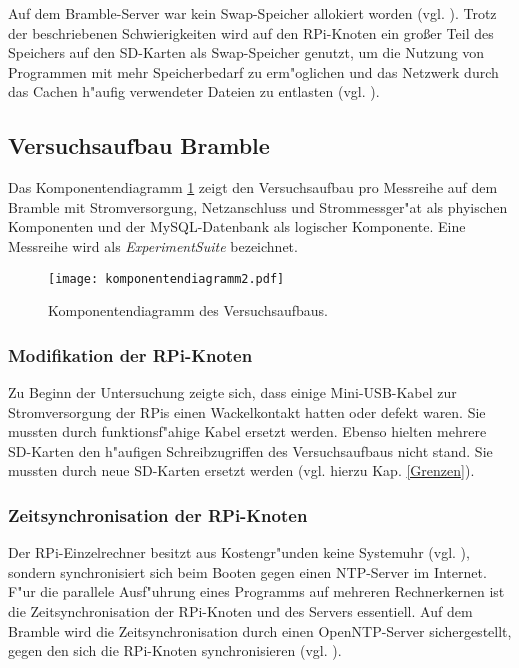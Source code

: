 Auf dem Bramble-Server war kein Swap-Speicher allokiert worden (vgl. \cite{kli13}). Trotz der beschriebenen Schwierigkeiten wird auf den RPi-Knoten ein gro\ss er Teil des Speichers auf den SD-Karten als Swap-Speicher genutzt, um die Nutzung von Programmen mit mehr Speicherbedarf zu erm"oglichen und das Netzwerk durch das Cachen h"aufig verwendeter Dateien zu entlasten (vgl. \cite{kli13}).  

\subsection{Versuchsaufbau Bramble}\label{Bramble-Versuchsaufbau}

Das Komponentendiagramm \ref{fig:Komponentendiagramm} zeigt den Versuchsaufbau pro Messreihe auf dem Bramble mit Stromversorgung, Netzanschluss und Strommessger"at als phyischen Komponenten und der MySQL-Datenbank als logischer Komponente. Eine Messreihe wird als \textit{ExperimentSuite} bezeichnet. 
\begin{figure}[htb]
  \centering
  \centerline{\texttt{[image: komponentendiagramm2.pdf]}} 
  \caption{Komponentendiagramm des Versuchsaufbaus.}
  \label{fig:Komponentendiagramm}		
\end{figure}
\subsubsection{Modifikation der RPi-Knoten}

Zu Beginn der Untersuchung zeigte sich, dass einige Mini-USB-Kabel zur Stromversorgung der RPis einen Wackelkontakt hatten oder defekt waren. Sie mussten durch funktionsf"ahige Kabel ersetzt werden. Ebenso hielten mehrere SD-Karten den h"aufigen Schreibzugriffen des Versuchsaufbaus nicht stand. Sie mussten durch neue SD-Karten ersetzt werden (vgl. hierzu Kap. \ref{Grenzen}).  

\subsubsection{Zeitsynchronisation der RPi-Knoten} 

Der RPi-Einzelrechner besitzt aus Kostengr"unden keine Systemuhr (vgl. \cite{schmi13}), sondern synchronisiert sich beim Booten gegen einen NTP-Server im Internet. F"ur die parallele Ausf"uhrung eines Programms auf mehreren Rechnerkernen ist die Zeitsynchronisation der RPi-Knoten und des Servers essentiell. Auf dem Bramble wird die Zeitsynchronisation durch einen OpenNTP-Server sichergestellt, gegen den sich die RPi-Knoten synchronisieren (vgl. \cite{kli13}). 

